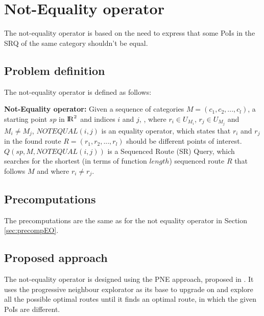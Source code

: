 

\section{Not-Equality operator}
The not-equality operator is based on the need to express that some PoIs in the SRQ of the same category shouldn't be equal.

\subsection{Problem definition} 
\label{sec:problemNEO}
The not-equality operator is defined as follows: \newline

\textbf{Not-Equality operator:} Given a sequence of categories $M = (c_1, c_2, ..., c_l)$, a starting point $sp$ in ${\rm I\!R}^2$ and indices $i$ and $j$, , where $r_i \in U_{M_{i}}$, $r_j \in U_{M_{j}}$ and $M_i \neq M_j$, $NOTEQUAL(i, j)$ is an equality operator, which states that $r_i$ and $r_j$ in the found route $R = (r_1, r_2, ..., r_l)$ should be different points of interest.
$Q(sp, M, NOTEQUAL(i, j))$ is a Sequenced Route (SR) Query, which searches for the shortest (in terms of function $length$) sequenced route $R$ that follows $M$ and where $r_i \neq r_j$.

\subsection{Precomputations} 
\label{sec:precompNEO}
The precomputations are the same as for the not equality operator in Section \ref{sec:precompEO}.

\subsection{Proposed approach} 
\label{sec:approachNEO}
The not-equality operator is designed using the PNE approach, proposed in \cite{OSR}. It uses the progressive neighbour explorator as its base to upgrade on and explore all the possible optimal routes until it finds an optimal route, in which the given PoIs are different.

